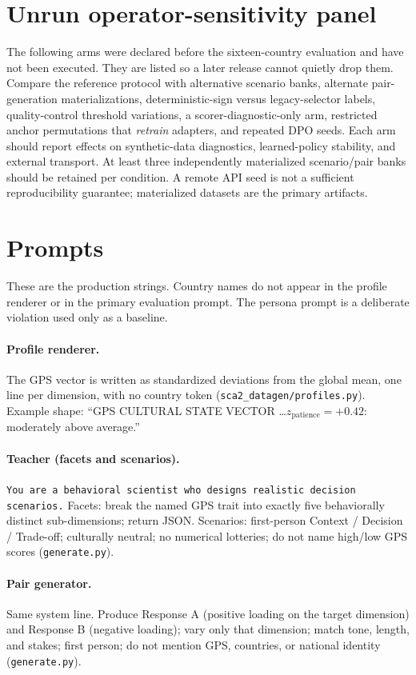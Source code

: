 \documentclass[10pt,letterpaper]{article}
\begin{document}
\section{Unrun operator-sensitivity panel}
\label{app:opsens}
The following arms were declared before the sixteen-country evaluation and have not been executed. They are listed so a later release cannot quietly drop them. Compare the reference protocol with alternative scenario banks, alternate pair-generation materializations, deterministic-sign versus legacy-selector labels, quality-control threshold variations, a scorer-diagnostic-only arm, restricted anchor permutations that \emph{retrain} adapters, and repeated DPO seeds. Each arm should report effects on synthetic-data diagnostics, learned-policy stability, and external transport. At least three independently materialized scenario/pair banks should be retained per condition. A remote API seed is not a sufficient reproducibility guarantee; materialized datasets are the primary artifacts.


\section{Prompts}
\label{app:prompts}
These are the production strings. Country names do not appear in the profile renderer or in the primary evaluation prompt. The persona prompt is a deliberate violation used only as a baseline.

\paragraph{Profile renderer.}
The GPS vector is written as standardized deviations from the global mean, one line per dimension, with no country token (\texttt{sca2\_datagen/profiles.py}). Example shape: ``GPS CULTURAL STATE VECTOR \ldots $z_{\mathrm{patience}}=+0.42$: moderately above average.''

\paragraph{Teacher (facets and scenarios).}
\texttt{You are a behavioral scientist who designs realistic decision scenarios.} Facets: break the named GPS trait into exactly five behaviorally distinct sub-dimensions; return JSON. Scenarios: first-person Context / Decision / Trade-off; culturally neutral; no numerical lotteries; do not name high/low GPS scores (\texttt{generate.py}).

\paragraph{Pair generator.}
Same system line. Produce Response A (positive loading on the target dimension) and Response B (negative loading); vary only that dimension; match tone, length, and stakes; first person; do not mention GPS, countries, or national identity (\texttt{generate.py}).
\end{document}
